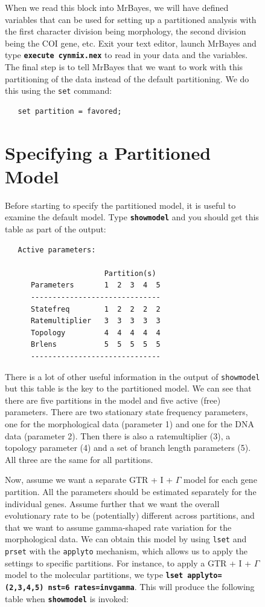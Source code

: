 \documentclass[12pt]{book}
\newcommand{\ttt}[1]{\texttt{#1}}
\newcommand{\tb}[1]{\ttt{\textbf{#1}}}
\begin{document}
\begin{figure}[h]
When we read this block into MrBayes, we will have defined variables that can be used for setting
up a partitioned analysis with the first character division being morphology, the second division
being the COI gene, etc. Exit your text editor, launch MrBayes and type \tb{execute cynmix.nex}
to read in your data and the variables. The final step is to tell MrBayes that we want to work with
this partitioning of the data instead of the default partitioning. We do this using the \ttt{set}
command:

\begin{singlespacing}
\footnotesize
\begin{verbatim}
   set partition = favored;
\end{verbatim}
\normalsize
\end{singlespacing}


\section{Specifying a Partitioned Model}

Before starting to specify the partitioned model, it is useful to examine the default model. Type
\tb{showmodel} and you should get this table as part of the output:

\begin{singlespacing}
\footnotesize
\begin{verbatim}
   Active parameters:

                       Partition(s)
      Parameters       1  2  3  4  5
      ------------------------------
      Statefreq        1  2  2  2  2
      Ratemultiplier   3  3  3  3  3
      Topology         4  4  4  4  4
      Brlens           5  5  5  5  5
      ------------------------------
\end{verbatim}
\normalsize
\end{singlespacing}

There is a lot of other useful information in the output of \ttt{showmodel} but this table is the
key to the partitioned model. We can see that there are five partitions in the model and five
active (free) parameters. There are two stationary state frequency parameters, one for the
morphological data (parameter 1) and one for the DNA data (parameter 2). Then there is also a
ratemultiplier (3), a topology parameter (4) and a set of branch length parameters (5). All three
are the same for all partitions.

Now, assume we want a separate GTR + I + $\Gamma$ model for each gene partition. All the parameters
should be estimated separately for the individual genes. Assume further that we want the overall
evolutionary rate to be (potentially) different across partitions, and that we want to assume
gamma-shaped rate variation for the morphological data. We can obtain this model by using
\ttt{lset} and \ttt{prset} with the \ttt{applyto} mechanism, which allows us to apply the settings
to specific partitions. For instance, to apply a GTR + I + $\Gamma$ model to the molecular partitions,
we type \tb{lset applyto=(2,3,4,5) nst=6 rates=invgamma}. This will produce the following table
when \tb{showmodel} is invoked:


\end{figure}
\end{document}
